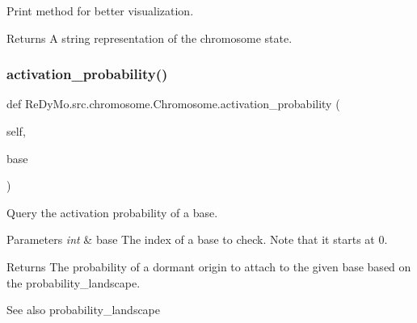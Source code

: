 Print method for better visualization. 

\begin{DoxyReturn}{Returns}
A string representation of the chromosome state. 
\end{DoxyReturn}
\mbox{\label{classReDyMo_1_1src_1_1chromosome_1_1Chromosome_ae1793cc7315be7cffaf4c1ab9385ba89}} 
\subsubsection{\texorpdfstring{activation\+\_\+probability()}{activation\_probability()}}
{\footnotesize\ttfamily def Re\+Dy\+Mo.\+src.\+chromosome.\+Chromosome.\+activation\+\_\+probability (\begin{DoxyParamCaption}\item[{}]{self,  }\item[{}]{base }\end{DoxyParamCaption})}



Query the activation probability of a base. 


\begin{DoxyParams}{Parameters}
{\em int} & base The index of a base to check. Note that it starts at 0. \\
\hline
\end{DoxyParams}
\begin{DoxyReturn}{Returns}
The probability of a dormant origin to attach to the given base based on the probability\+\_\+landscape. 
\end{DoxyReturn}
\begin{DoxySeeAlso}{See also}
probability\+\_\+landscape 
\end{DoxySeeAlso}
\mbox{\label{classReDyMo_1_1src_1_1chromosome_1_1Chromosome_a1dba7152914a8f8006a5ddfcaad82c31}} 
